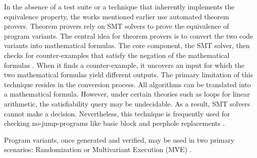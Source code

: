 \vspace{1em}

\begin{checking}
    \label{check_by_smt}
    In the absence of a test suite or a technique that inherently implements the equivalence property, the works mentioned earlier use automated theorem provers.
    Theorem provers rely on SMT solvers \cite{SMT_solver} to prove the equivalence of program variants. 
    The central idea for theorem provers is to convert the two code variants into mathematical formulas. 
    The core component, the SMT solver, then checks for counter-examples that satisfy the negation of the mathematical formulas \cite{kesseli2018counterexample}.
    When it finds a counter-example, it uncovers an input for which the two mathematical formulas yield different outputs. 
    The primary limitation of this technique resides in the conversion process.    
    All algorithms can be translated into a mathematical formula. 
    However, under certain theories such as loops for linear arithmetic, the satisfiability query may be undecidable. 
    As a result, SMT solvers cannot make a decision.
    Nevertheless, this technique is frequently used for checking no-jump-programs like basic block and peephole replacements \cite{SuperoptimizationScaling}.
\end{checking}



\label{deployment}
Program variants, once generated and verified, may be used in two primary scenarios: Randomization or Multivariant Execution (MVE) \cite{jackson}. 


